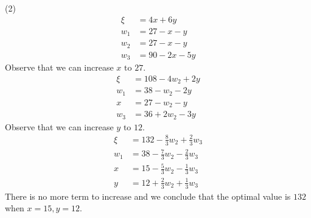 \documentclass[letterpaper,12pt]{article}
\theoremstyle{definition}
\begin{document}
(2)
\begin{align*}
  \xi &= 4x+6y \\
  w_1 &= 27 -x-y \\
  w_2 &= 27-x-y \\
  w_3 &= 90-2x-5y
\end{align*}
Observe that we can increase $x \text{ to } 27.$
\begin{align*}
  \xi &= 108 - 4w_2 +2y \\
  w_1 &= 38 - w_2 - 2y \\
  x &= 27 - w_2 - y \\
  w_3 &= 36 + 2w_2 - 3y
\end{align*}
Observe that we can increase $y \text{ to } 12.$
\begin{align*}
  \xi &= 132 - \frac{8}{3}w_2 + \frac{2}{3} w_3\\
  w_1 &= 38 - \frac{7}{3}w_2 - \frac{2}{3}w_3 \\
  x &= 15 - \frac{5}{3}w_2 - \frac{1}{3}w_3 \\
  y &= 12 + \frac{2}{3}w_2 + \frac{1}{3}w_3
\end{align*}
There is no more term to increase and we conclude that the optimal value is $132$ when $x = 15, y =12.$ \\
\end{document}
